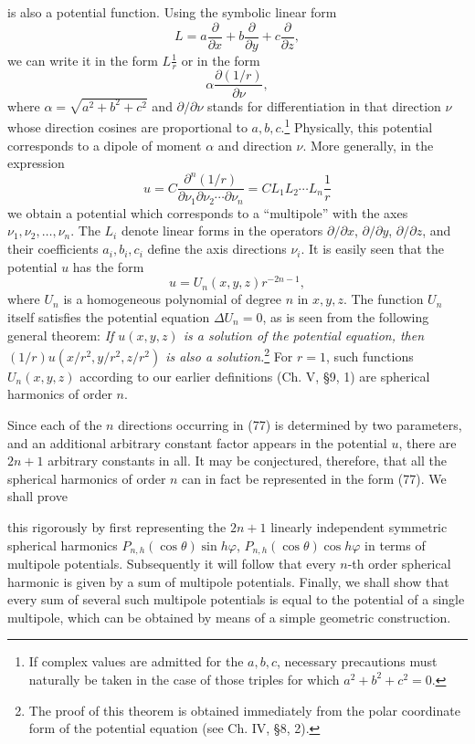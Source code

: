 is also a potential function. Using the symbolic linear form
\[
L=a\frac{\partial}{\partial x}+b\frac{\partial}{\partial y}+c\frac{\partial}{\partial z},
\]
we can write it in the form $L\frac1r$ or in the form
\[
\alpha\frac{\partial(1/r)}{\partial\nu},
\]
where $\alpha=\sqrt{a^2+b^2+c^2}$ and $\partial/\partial\nu$ stands for differentiation in that direction $\nu$ whose direction cosines are proportional to $a,b,c$.\footnote{If complex values are admitted for the $a,b,c$, necessary precautions must naturally be taken in the case of those triples for which $a^2+b^2+c^2=0$.} Physically, this potential corresponds to a dipole of moment $\alpha$ and direction $\nu$. More generally, in the expression
\begin{equation}\tag{77}
u=C\frac{\partial^n(1/r)}{\partial\nu_1\partial\nu_2\cdots\partial\nu_n}
=CL_1L_2\cdots L_n\frac1r
\end{equation}
we obtain a potential which corresponds to a ``multipole'' with the axes $\nu_1,\nu_2,\ldots,\nu_n$. The $L_i$ denote linear forms in the operators $\partial/\partial x$, $\partial/\partial y$, $\partial/\partial z$, and their coefficients $a_i,b_i,c_i$ define the axis directions $\nu_i$. It is easily seen that the potential $u$ has the form
\begin{equation}\tag{78}
u=U_n(x,y,z)r^{-2n-1},
\end{equation}
where $U_n$ is a homogeneous polynomial of degree $n$ in $x,y,z$. The function $U_n$ itself satisfies the potential equation $\Delta U_n=0$, as is seen from the following general theorem: \emph{If $u(x,y,z)$ is a solution of the potential equation, then $(1/r)u(x/r^2,y/r^2,z/r^2)$ is also a solution.}\footnote{The proof of this theorem is obtained immediately from the polar coordinate form of the potential equation (see Ch. IV, \S8, 2).} For $r=1$, such functions $U_n(x,y,z)$ according to our earlier definitions (Ch. V, \S9, 1) are spherical harmonics of order $n$.

Since each of the $n$ directions occurring in (77) is determined by two parameters, and an additional arbitrary constant factor appears in the potential $u$, there are $2n+1$ arbitrary constants in all. It may be conjectured, therefore, that all the spherical harmonics of order $n$ can in fact be represented in the form (77). We shall prove

this rigorously by first representing the $2n+1$ linearly independent symmetric spherical harmonics $P_{n,h}(\cos\theta)\sin h\varphi$, $P_{n,h}(\cos\theta)\cos h\varphi$ in terms of multipole potentials. Subsequently it will follow that every $n$-th order spherical harmonic is given by a sum of multipole potentials. Finally, we shall show that every sum of several such multipole potentials is equal to the potential of a single multipole, which can be obtained by means of a simple geometric construction.

